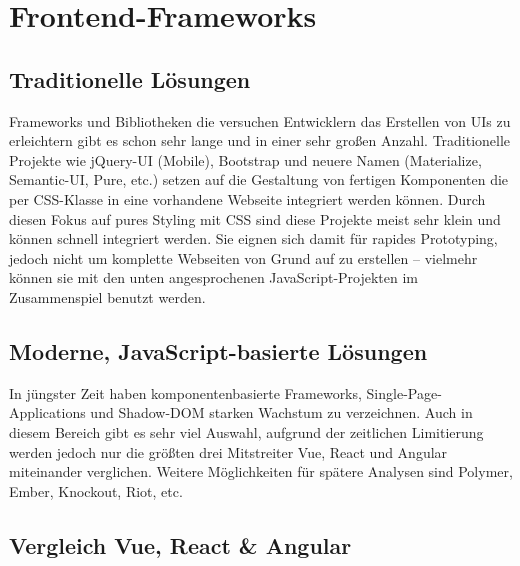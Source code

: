 \section{Frontend-Frameworks}
\subsection{Traditionelle Lösungen}
Frameworks und Bibliotheken die versuchen Entwicklern das Erstellen von UIs zu erleichtern gibt es schon sehr lange und in einer sehr großen Anzahl. Traditionelle Projekte wie jQuery-UI (Mobile), Bootstrap und neuere Namen (Materialize, Semantic-UI, Pure, etc.) setzen auf die Gestaltung von fertigen Komponenten die per CSS-Klasse in eine vorhandene Webseite integriert werden können. Durch diesen Fokus auf pures Styling mit CSS sind diese Projekte meist sehr klein und können schnell integriert werden. Sie eignen sich damit für rapides Prototyping, jedoch nicht um komplette Webseiten von Grund auf zu erstellen -- vielmehr können sie mit den unten angesprochenen JavaScript-Projekten im Zusammenspiel benutzt werden.

\subsection{Moderne, JavaScript-basierte Lösungen}
In jüngster Zeit haben komponentenbasierte Frameworks, Single-Page-Applications und Shadow-DOM starken Wachstum zu verzeichnen. 
Auch in diesem Bereich gibt es sehr viel Auswahl, aufgrund der zeitlichen Limitierung werden jedoch nur die größten drei Mitstreiter Vue, React und Angular  miteinander verglichen. Weitere Möglichkeiten für spätere Analysen sind Polymer, Ember, Knockout, Riot, etc.

\subsection{Vergleich Vue, React \& Angular}

